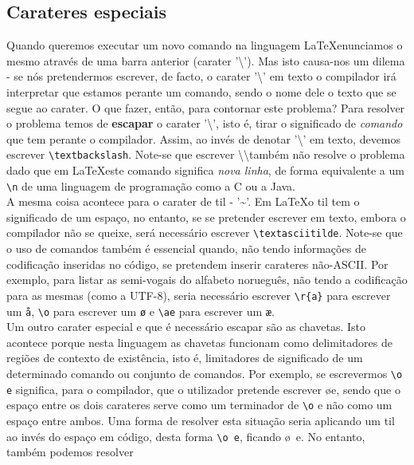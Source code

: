 \documentclass[a4paper, onecolumn, 10pt]{report}
\begin{document}
\subsection{Carateres especiais}
Quando queremos executar um novo comando na linguagem \LaTeX enunciamos o mesmo através de uma barra anterior (carater '\textbackslash'). Mas isto causa-nos
um dilema - se nós pretendermos escrever, de facto, o carater '\textbackslash' em texto o compilador irá interpretar que estamos perante um comando, sendo o
nome dele o texto que se segue ao carater. O que fazer, então, para contornar este problema? Para resolver o problema temos de \textbf{escapar} o carater '\textbackslash',
isto é, tirar o significado de \textit{comando} que tem perante o compilador. Assim, ao invés de denotar '\textbackslash' em texto, devemos escrever \texttt{\textbackslash textbackslash}.
Note-se que escrever \textbackslash \textbackslash também não resolve o problema dado que em \LaTeX este comando significa \textit{nova linha}, de forma equivalente
a um \texttt{\textbackslash n} de uma linguagem de programação como a C ou a Java. \\
A mesma coisa acontece para o carater de til - '\textasciitilde'. Em \LaTeX o til tem o significado de um espaço, no entanto, se se pretender escrever em texto, embora
o compilador não se queixe, será necessário escrever \texttt{\textbackslash textasciitilde}. Note-se que o uso de comandos também é essencial quando, não tendo
informações de codificação inseridas no código, se pretendem inserir carateres não-\ac{ASCII}. Por exemplo, para listar as semi-vogais do alfabeto norueguês, não
tendo a codificação para as mesmas (como a \ac{UTF}-8), seria necessário escrever \texttt{\textbackslash r\{a\}} para escrever um \texttt{å}, \texttt{\textbackslash o} para
escrever um \texttt{ø} e \texttt{\textbackslash ae} para escrever um \texttt{æ}. \\
Um outro carater especial e que é necessário escapar são as chavetas. Isto acontece porque nesta linguagem as chavetas funcionam como delimitadores de regiões de contexto
de existência, isto é, limitadores de significado de um determinado comando ou conjunto de comandos. Por exemplo, se escrevermos \texttt{\textbackslash o e} significa, para o compilador,
que o utilizador pretende escrever \o e, sendo que o espaço entre os dois carateres serve como um terminador de \texttt{\textbackslash o} e não como um espaço entre ambos. Uma
forma de resolver esta situação seria aplicando um til ao invés do espaço em código, desta forma \texttt{\textbackslash o~e}, ficando \o~e. No entanto, também podemos resolver
\end{document}
